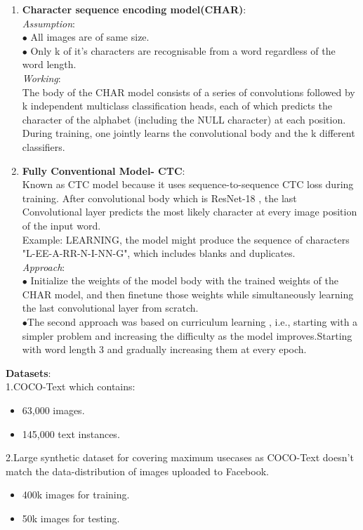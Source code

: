 \documentclass[12pt,a4paper]{article}
\begin{document}
\begin{enumerate}
	\item  {\textbf{Character sequence encoding model(CHAR)}:\\
\textit{Assumption}:\\
$\bullet$ All images are of same size.\\
$\bullet$ Only k of it's characters are recognisable from a word regardless of the word length.\\
\textit{Working}:\\
The body of the CHAR model consists of a series of convolutions followed by k independent multiclass classification heads, each of which predicts the character of the alphabet (including the NULL character) at each position. During training, one jointly learns the convolutional body and the k different classifiers.}\\
\item {\textbf{Fully Conventional Model- CTC}:\\
	Known as CTC model because it uses sequence-to-sequence CTC loss during training.
	After convolutional body which is ResNet-18 , the last Convolutional layer predicts the most likely character at every image position of the input word.\\
	Example: LEARNING, the model might produce the sequence of characters "L-EE-A-RR-N-I-NN-G", which includes blanks and duplicates.\\
	\textit{Approach}:\\
	$\bullet$ Initialize the weights of the model body with the trained weights of the CHAR model, and then finetune those weights while simultaneously learning the last convolutional layer from scratch.\\
	$\bullet$The second approach was based on
	curriculum learning , i.e., starting with a simpler problem and increasing the difficulty as the model improves.Starting with word length 3 and gradually increasing them at every epoch.
}
\end{enumerate}
\newpage
\textbf{Datasets}:\\
1.COCO-Text which contains:
\begin{itemize}
	\item  63,000 images.
	\item  145,000 text instances.
\end{itemize}
2.Large synthetic dataset for covering maximum usecases as COCO-Text doesn't match the data-distribution of images uploaded to Facebook.
\begin{itemize} 
	\item 400k images for training.
	\item 50k images for testing.
\end{itemize}
\end{document}
